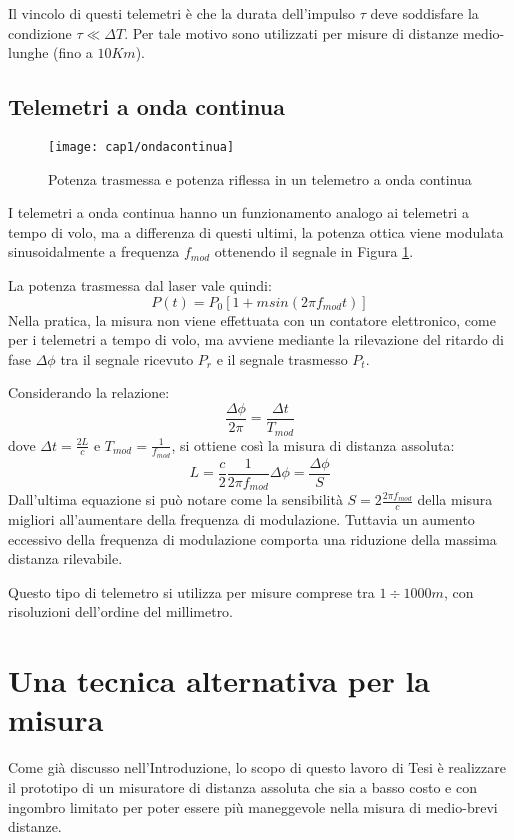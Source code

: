 Il vincolo di questi telemetri è che la durata dell'impulso $\tau$ deve soddisfare la condizione $\tau \ll \Delta T$. Per tale motivo sono utilizzati per misure di distanze medio-lunghe (fino a $10 Km$). 

\subsection{Telemetri a onda continua}
\begin{figure}[H]
  \begin{center}
    \texttt{[image: cap1/ondacontinua]}
    \caption{Potenza trasmessa e potenza riflessa in un telemetro a onda continua}
    \label{ondacontinua}
  \end{center}
\end{figure}
I telemetri a onda continua hanno un funzionamento analogo ai telemetri a tempo di volo, ma a differenza di questi ultimi, la potenza ottica viene modulata sinusoidalmente a frequenza $f_{mod}$ ottenendo il segnale in Figura \ref{ondacontinua}.

La potenza trasmessa dal laser vale quindi:
\begin{equation}
	 P(t)=P_0[1+msin(2\pi f_{mod}t)]
\end{equation} 
Nella pratica, la misura non viene effettuata con un contatore elettronico, come per i telemetri a tempo di volo, ma avviene mediante la rilevazione del ritardo di fase $\Delta\phi$ tra il segnale ricevuto $P_r$ e il segnale trasmesso $P_t$.

Considerando la relazione:
\begin{equation}
  \frac{\Delta\phi}{2\pi}=\frac{\Delta t}{T_{mod}}
\end{equation}
dove $\Delta t=\frac{2L}{c}$ e $T_{mod}=\frac{1}{f_{mod}}$, si ottiene così la misura di distanza assoluta:
\begin{equation}
  L=\frac{c}{2}\frac{1}{2\pi f_{mod}}\Delta\phi=\frac{\Delta\phi}{S}
\end{equation}
Dall'ultima equazione si può notare come la sensibilità $S=2 \frac{2\pi f_{mod}}{c}$ della misura migliori all'aumentare della frequenza di modulazione. Tuttavia un aumento eccessivo della frequenza di modulazione comporta una riduzione della massima distanza rilevabile. 

Questo tipo di telemetro si utilizza per misure comprese tra $1 \div 1000m$, con risoluzioni dell'ordine del millimetro. 

\section{Una tecnica alternativa per la misura}
Come già discusso nell'Introduzione, lo scopo di questo lavoro di Tesi è realizzare il prototipo di un misuratore di distanza assoluta che sia a basso costo e con ingombro limitato per poter essere più maneggevole nella misura di medio-brevi distanze.

